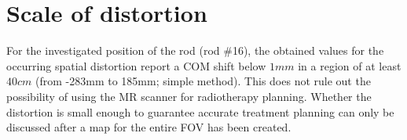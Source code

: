 \section{Scale of distortion}

For the investigated position of the rod (rod \#16), the obtained values for the occurring spatial distortion report a COM shift below $1mm$ in a region of at least $40cm$ (from -283mm to 185mm; simple method).
This does not rule out the possibility of using the MR scanner for radiotherapy planning.
Whether the distortion is small enough to guarantee accurate treatment planning can only be discussed after a map for the entire FOV has been created.


